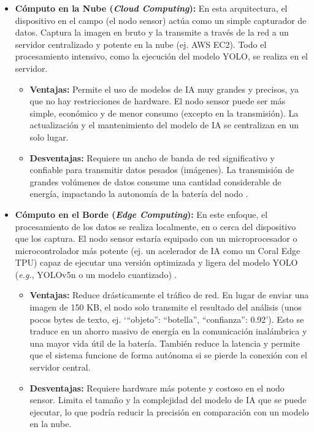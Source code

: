 \begin{itemize}
    \item \textbf{Cómputo en la Nube (\textit{Cloud Computing}):} En esta arquitectura, el dispositivo en el campo (el nodo sensor) actúa como un simple capturador de datos. Captura la imagen en bruto y la transmite a través de la red a un servidor centralizado y potente en la nube (ej. AWS EC2). Todo el procesamiento intensivo, como la ejecución del modelo YOLO, se realiza en el servidor.
        \begin{itemize}
            \item \textbf{Ventajas:} Permite el uso de modelos de IA muy grandes y precisos, ya que no hay restricciones de hardware. El nodo sensor puede ser más simple, económico y de menor consumo (excepto en la transmisión). La actualización y el mantenimiento del modelo de IA se centralizan en un solo lugar.
            \item \textbf{Desventajas:} Requiere un ancho de banda de red significativo y confiable para transmitir datos pesados (imágenes). La transmisión de grandes volúmenes de datos consume una cantidad considerable de energía, impactando la autonomía de la batería del nodo \cite{li2018learning}.
        \end{itemize}

    \item \textbf{Cómputo en el Borde (\textit{Edge Computing}):} En este enfoque, el procesamiento de los datos se realiza localmente, en o cerca del dispositivo que los captura. El nodo sensor estaría equipado con un microprocesador o microcontrolador más potente (ej. un acelerador de IA como un Coral Edge TPU) capaz de ejecutar una versión optimizada y ligera del modelo YOLO (\textit{e.g.}, YOLOv5n o un modelo cuantizado) \cite{chen2019deep}.
        \begin{itemize}
            \item \textbf{Ventajas:} Reduce drásticamente el tráfico de red. En lugar de enviar una imagen de 150 KB, el nodo solo transmite el resultado del análisis (unos pocos bytes de texto, ej. `{``objeto'': ``botella'', ``confianza'': 0.92}'). Esto se traduce en un ahorro masivo de energía en la comunicación inalámbrica y una mayor vida útil de la batería. También reduce la latencia y permite que el sistema funcione de forma autónoma si se pierde la conexión con el servidor central.
            \item \textbf{Desventajas:} Requiere hardware más potente y costoso en el nodo sensor. Limita el tamaño y la complejidad del modelo de IA que se puede ejecutar, lo que podría reducir la precisión en comparación con un modelo en la nube.
        \end{itemize}
\end{itemize}

